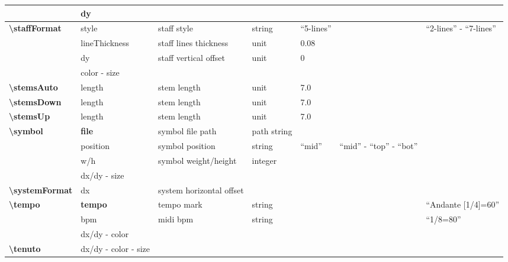 \documentclass[a4paper, landscape, 10pt]{article}
\begin{document}
\begin{tabularx}{\linewidth}{p{3cm}p{3cm}p{5cm}p{3cm}p{2.5cm}p{3.5cm}p{4cm}}
    &dy&&&&&\\
    \hline
    \textbf{\textbackslash{}staffFormat}&style&staff style&string&``5-lines''&&``2-lines'' - ``7-lines''\\
    &lineThickness&staff lines thickness&unit&0.08&&\\
    &dy&staff vertical offset&unit&0&&\\
    &color - size&&&&&\\
    \hline
    \textbf{\textbackslash{}stemsAuto}&length&stem length&unit&7.0&&\\
    \hline
    \textbf{\textbackslash{}stemsDown}&length&stem length&unit&7.0&&\\
    \hline
    \textbf{\textbackslash{}stemsUp}&length&stem length&unit&7.0&&\\
    \hline
    \textbf{\textbackslash{}symbol}&\textbf{file}&symbol file path&path string&&&\\
    &position&symbol position&string&``mid''&``mid'' - ``top'' - ``bot''&\\
    &w/h&symbol weight/height&integer&&&\\
    &dx/dy - size&&&&&\\
    \hline
    \textbf{\textbackslash{}systemFormat}&dx&system horizontal offset&&&&\\
    \hline
    \textbf{\textbackslash{}tempo}&\textbf{tempo}&tempo mark&string&&&``Andante [1/4]=60''\\
    &bpm&midi bpm&string&&&``1/8=80''\\
    &dx/dy - color&&&&&\\
    \hline
    \textbf{\textbackslash{}tenuto}&dx/dy - color - size&&&&&\\
    \hline
\end{tabularx}
\end{document}
